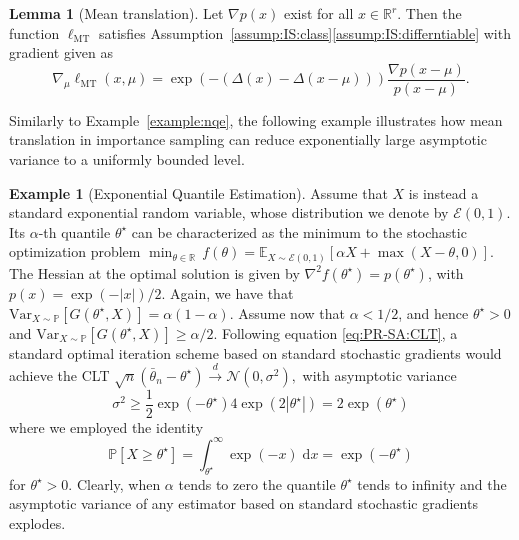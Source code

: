 \documentclass[11pt,a4paper]{article}
\theoremstyle{definition}
\newtheorem{lemma}[theorem]{Lemma}
\newtheorem{example}[theorem]{Example}
\DeclareMathOperator*{\MT}{MT}
\renewcommand{\tfrac}[2]{#1/#2}
\renewcommand{\Re}{\mathbb R}
\begin{document}
\begin{lemma}[Mean translation]
\label{lemma:MT:assump:IS}
Let $\nabla p(x)$ exist for all $x\in \Re^r$. Then the function $\ell_{\MT}$ satisfies Assumption~\ref{assump:IS:class}\ref{assump:IS:differntiable} with gradient given as
\[
  \nabla_\mu \ell_{\MT}(x,\mu) = \exp(-(\Delta(x)-\Delta(x-\mu)))\frac{\nabla p(x-\mu)}{p(x-\mu)}.
\]
\end{lemma}

Similarly to Example~\ref{example:nqe}, the following example illustrates how mean translation in importance sampling can reduce exponentially large asymptotic variance to a uniformly bounded level.

\begin{example}[Exponential Quantile Estimation]
Assume that $X$ is instead a standard exponential random variable, whose distribution we denote by $\mathcal E(0,1)$. Its $\alpha$-th quantile $\theta^\star$ can be characterized as the minimum to the stochastic optimization problem
\(
\min_{\theta\in \mathbb R}\,f(\theta)=\mathbb E_{X\sim \mathcal E(0, 1)}\left[ \alpha X + \max(X - \theta, 0) \right].
\)
The Hessian at the optimal solution is given by $\nabla^2 f(\theta^\star) = p(\theta^\star)$, with $p(x) = \tfrac{\exp(-|x|)}{2}$. 
Again, we have that $\text{Var}_{X \sim \mathbb P}\left[G(\theta^\star,X)\right] = \alpha(1-\alpha)$. Assume now that $\alpha < 1/2$, and hence $\theta^\star>0$ and $\text{Var}_{X \sim \mathbb P}\left[G(\theta^\star,X)\right]\geq \alpha/2$.
Following equation \eqref{eq:PR-SA:CLT}, a standard optimal iteration scheme based on standard stochastic gradients would achieve the CLT
\(
\sqrt{n}\left( \bar{\theta}_n - \theta^\star \right) \overset{d}{\to} \mathcal N \left(0, \sigma^2  \right),
\)
with asymptotic variance $$\sigma^2 \geq \frac{1}{2} \exp(-\theta^\star) 4 \exp(2|\theta^\star|)=2\exp(\theta^\star)$$ where we employed the identity $$\mathbb P[X\geq \theta^\star] = \int^\infty_{\theta^\star}  \exp(-x) \; \text{d} x =\exp(-\theta^\star)$$ for $\theta^\star>0$. Clearly, when $\alpha$ tends to zero the quantile $\theta^\star$ tends to infinity and the asymptotic variance of any estimator based on standard stochastic gradients explodes.


\end{example}
\end{document}
